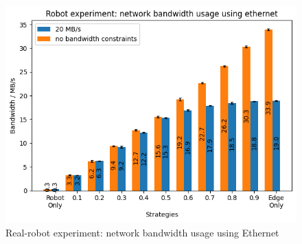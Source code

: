 \begin{figure}
    \centering
    \includegraphics[width=\linewidth]{figures/experiment/real_robot/eth/bandwidth.png}
    \caption{Real-robot experiment: network bandwidth usage using Ethernet}
    \label{fig:real_robot_experiment:eth_bandwidth}
\end{figure}
